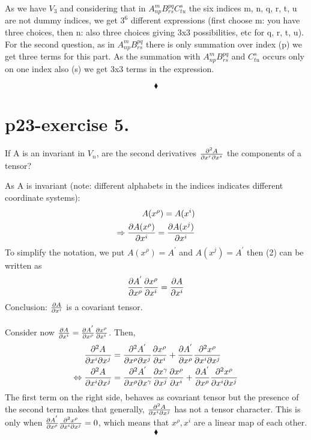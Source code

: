 As we have $V_{3}$ and considering that in $A^{m}_{np} B^{pq}_{rs}C^{s}_{tu}$ the six indices m, n, q, r, t, u are not dummy indices, we get $3^{6}$ different expressions (first choose m: you have three choices, then n: also three choices giving 3x3 possibilities, etc for q, r, t, u).\\
For the second question, as in $A^{m}_{np} B^{pq}_{rs}$ there is only summation over index (p) we get three terms for this part. As the summation with $A^{m}_{np} B^{pq}_{rs}$ and $C^{s}_{tu}$ occurs only on one index also (s) we get 3x3 terms in the expression.

$$\blacklozenge$$
\newpage

\section{p23-exercise 5.}
\begin{tcolorbox}
If A  is an invariant in $V_{n}$, are the second derivatives $\pdv{A}{x^{r}}{x^{s}}$ the components of a tensor?
\end{tcolorbox}

As A is invariant (note: different alphabets in the indices indicates different coordinate systems):
\begin{align}
\ A(x^{\rho}) = A(x^{i})\\
\Rightarrow \pdv{A(x^{\rho})}{x^{i}} = \pdv{A(x^{j})}{x^{i}}
\end{align}
To simplify the notation, we put $A(x^{\rho}) = A^{'}$ and $A(x^{j}) = A^{'}$ then (2) can be written as
\begin{align}
\pdv{A^{'}}{x^{\rho}}\pdv{x^{\rho}}{x^{i}} = \pdv{A}{x^{i}}
 \end{align}
 Conclusion: $\pdv{A}{x^{i}}$ is a covariant tensor. \\\\Consider now $\pdv{A}{x^{i}} = \pdv{A^{'}}{x^{\rho}}\pdv{x^{\rho}}{x^{i}}$. Then,
\begin{align}
\pdv{A}{x^{i}}{x^{j}} &= \pdv{A^{'}}{x^{\rho}}{x^{j}}\pdv{x^{\rho}}{x^{i}}+ \pdv{A^{'}}{x^{\rho}}\pdv{x^{\rho}}{x^{i}}{x^{j}}\\
\Leftrightarrow \pdv{A}{x^{i}}{x^{j}} &= \pdv{A^{'}}{x^{\rho}}{x^{\gamma}}\pdv{x^{\gamma}}{x^{j}}\pdv{x^{\rho}}{x^{i}}+ \pdv{A^{'}}{x^{\rho}}\pdv{x^{\rho}}{x^{i}}{x^{j}}
\end{align}
The first term on the right side, behaves as covariant tensor but the presence of the second term makes that generally, $\pdv{A}{x^{i}}{x^{j}}$ has not a tensor character. This is only when $\pdv{A^{'}}{x^{\rho}}\pdv{x^{\rho}}{x^{i}}{x^{j}}=0$, which means that $x^{\rho}, x^{i}$ are a linear map of each other.
$$\blacklozenge$$
\pagebreak[4]


